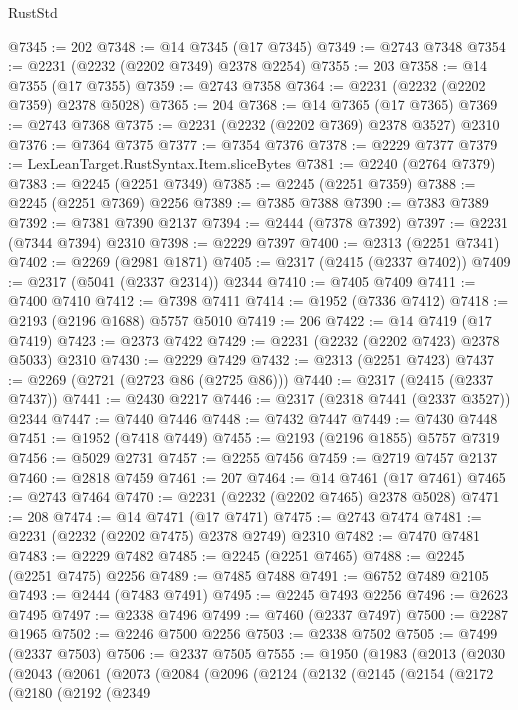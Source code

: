 \begin{lexlean}{RustStd}
\begin{coremodule}
@7345 := 202
@7348 := @14 @7345 (@17 @7345)
@7349 := @2743 @7348
@7354 := @2231 (@2232 (@2202 @7349) @2378 @2254)
@7355 := 203
@7358 := @14 @7355 (@17 @7355)
@7359 := @2743 @7358
@7364 := @2231 (@2232 (@2202 @7359) @2378 @5028)
@7365 := 204
@7368 := @14 @7365 (@17 @7365)
@7369 := @2743 @7368
@7375 := @2231 (@2232 (@2202 @7369) @2378 @3527) @2310
@7376 := @7364 @7375
@7377 := @7354 @7376
@7378 := @2229 @7377
@7379 := LexLeanTarget.RustSyntax.Item.sliceBytes
@7381 := @2240 (@2764 @7379)
@7383 := @2245 (@2251 @7349)
@7385 := @2245 (@2251 @7359)
@7388 := @2245 (@2251 @7369) @2256
@7389 := @7385 @7388
@7390 := @7383 @7389
@7392 := @7381 @7390 @2137
@7394 := @2444 (@7378 @7392)
@7397 := @2231 (@7344 @7394) @2310
@7398 := @2229 @7397
@7400 := @2313 (@2251 @7341)
@7402 := @2269 (@2981 @1871)
@7405 := @2317 (@2415 (@2337 @7402))
@7409 := @2317 (@5041 (@2337 @2314)) @2344
@7410 := @7405 @7409
@7411 := @7400 @7410
@7412 := @7398 @7411
@7414 := @1952 (@7336 @7412)
@7418 := @2193 (@2196 @1688) @5757 @5010
@7419 := 206
@7422 := @14 @7419 (@17 @7419)
@7423 := @2373 @7422
@7429 := @2231 (@2232 (@2202 @7423) @2378 @5033) @2310
@7430 := @2229 @7429
@7432 := @2313 (@2251 @7423)
@7437 := @2269 (@2721 (@2723 @86 (@2725 @86)))
@7440 := @2317 (@2415 (@2337 @7437))
@7441 := @2430 @2217
@7446 := @2317 (@2318 @7441 (@2337 @3527)) @2344
@7447 := @7440 @7446
@7448 := @7432 @7447
@7449 := @7430 @7448
@7451 := @1952 (@7418 @7449)
@7455 := @2193 (@2196 @1855) @5757 @7319
@7456 := @5029 @2731
@7457 := @2255 @7456
@7459 := @2719 @7457 @2137
@7460 := @2818 @7459
@7461 := 207
@7464 := @14 @7461 (@17 @7461)
@7465 := @2743 @7464
@7470 := @2231 (@2232 (@2202 @7465) @2378 @5028)
@7471 := 208
@7474 := @14 @7471 (@17 @7471)
@7475 := @2743 @7474
@7481 := @2231 (@2232 (@2202 @7475) @2378 @2749) @2310
@7482 := @7470 @7481
@7483 := @2229 @7482
@7485 := @2245 (@2251 @7465)
@7488 := @2245 (@2251 @7475) @2256
@7489 := @7485 @7488
@7491 := @6752 @7489 @2105
@7493 := @2444 (@7483 @7491)
@7495 := @2245 @7493 @2256
@7496 := @2623 @7495
@7497 := @2338 @7496
@7499 := @7460 (@2337 @7497)
@7500 := @2287 @1965
@7502 := @2246 @7500 @2256
@7503 := @2338 @7502
@7505 := @7499 (@2337 @7503)
@7506 := @2337 @7505
@7555 := @1950
    (@1983
      (@2013
        (@2030
          (@2043
            (@2061
              (@2073
                (@2084
                  (@2096
                    (@2124
                      (@2132
                        (@2145
                          (@2154
                            (@2172
                              (@2180
                                (@2192
                                  (@2349

\end{coremodule}
\end{lexlean}
